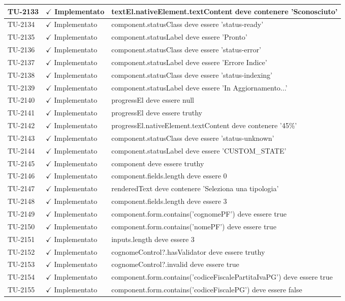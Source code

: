 ﻿\documentclass[a4paper,12pt]{article}
\newcommand{\ok}{\textcolor{green!60!black}{$\checkmark$ Implementato}}
\begin{document}
\begin{longtable}{|p{2cm}|p{3.5cm}|p{9.5cm}|}
\hline
TU-2133 & \ok & textEl.nativeElement.textContent deve contenere 'Sconosciuto' \\
\hline
TU-2134 & \ok & component.statusClass deve essere 'status-ready' \\
\hline
TU-2135 & \ok & component.statusLabel deve essere 'Pronto' \\
\hline
TU-2136 & \ok & component.statusClass deve essere 'status-error' \\
\hline
TU-2137 & \ok & component.statusLabel deve essere 'Errore Indice' \\
\hline
TU-2138 & \ok & component.statusClass deve essere 'status-indexing' \\
\hline
TU-2139 & \ok & component.statusLabel deve essere 'In Aggiornamento...' \\
\hline
TU-2140 & \ok & progressEl deve essere null \\
\hline
TU-2141 & \ok & progressEl deve essere truthy \\
\hline
TU-2142 & \ok & progressEl.nativeElement.textContent deve contenere '45\%' \\
\hline
TU-2143 & \ok & component.statusClass deve essere 'status-unknown' \\
\hline
TU-2144 & \ok & component.statusLabel deve essere 'CUSTOM\_STATE' \\
\hline
TU-2145 & \ok & component deve essere truthy \\
\hline
TU-2146 & \ok & component.fields.length deve essere 0 \\
\hline
TU-2147 & \ok & renderedText deve contenere 'Seleziona una tipologia' \\
\hline
TU-2148 & \ok & component.fields.length deve essere 3 \\
\hline
TU-2149 & \ok & component.form.contains('cognomePF') deve essere true \\
\hline
TU-2150 & \ok & component.form.contains('nomePF') deve essere true \\
\hline
TU-2151 & \ok & inputs.length deve essere 3 \\
\hline
TU-2152 & \ok & cognomeControl?.hasValidator deve essere truthy \\
\hline
TU-2153 & \ok & cognomeControl?.invalid deve essere true \\
\hline
TU-2154 & \ok & component.form.contains('codiceFiscalePartitaIvaPG') deve essere true \\
\hline
TU-2155 & \ok & component.form.contains('codiceFiscalePG') deve essere false \\

\end{longtable}
\end{document}
